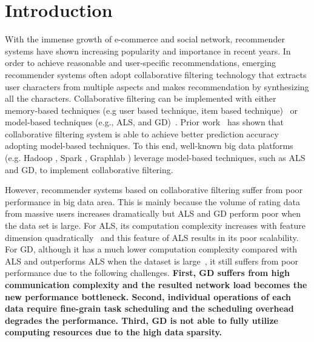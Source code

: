 \documentclass{llncs}
\begin{document}
\section{Introduction}
\vspace{-5pt}

With the immense growth of e-commerce and social network, recommender systems have shown increasing popularity and importance in recent years.
In order to achieve reasonable and user-specific recommendations, emerging recommender systems often adopt collaborative filtering technology that extracts user characters from multiple aspects and makes recommendation by synthesizing all the characters. Collaborative filtering can be implemented with either memory-based techniques (e.g user based technique, item based technique)~\cite{MemoryBasedCF} or model-based techniques (e.g., ALS, and GD)~\cite{towards}. Prior work~\cite{MF2009,recSurvey2013} has shown that collaborative filtering system is able to achieve better prediction accuracy adopting model-based techniques. To this end, well-known big data platforms (e.g. Hadoop \cite{Hadoop}, Spark \cite{SparkMllib}, Graphlab \cite{graphlab}) leverage model-based techniques, such as ALS and GD, to implement collaborative filtering.


However, recommender systems based on collaborative filtering suffer from poor performance in big data area. This is mainly because the volume of rating data from massive users increases dramatically but ALS and GD perform poor when the data set is large.
For ALS, its computation complexity increases with feature dimension quadratically~\cite{ibm2011} and this feature of ALS results in its poor scalability. For GD, although it has a much lower computation complexity compared with ALS and outperforms ALS when the dataset is large~\cite{sgdKdd2015,sgdFast2015,ibm2011}, it still suffers from poor performance due to the following challenges.
\textbf{First, GD suffers from high communication complexity and the resulted network load becomes the new performance bottleneck. Second, individual operations of each data require fine-grain task scheduling and the scheduling overhead degrades the performance. Third, GD is not able to fully utilize computing resources due to the high data sparsity.}
\end{document}
